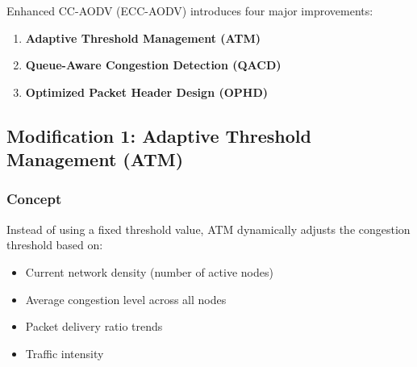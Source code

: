 \documentclass[12pt,a4paper]{article}
\begin{document}
Enhanced CC-AODV (ECC-AODV) introduces four major improvements:

\begin{enumerate}
    \item \textbf{Adaptive Threshold Management (ATM)}
    \item \textbf{Queue-Aware Congestion Detection (QACD)}
    \item \textbf{Optimized Packet Header Design (OPHD)}
\end{enumerate}

\subsection{Modification 1: Adaptive Threshold Management (ATM)}

\subsubsection{Concept}
Instead of using a fixed threshold value, ATM dynamically adjusts the congestion threshold based on:
\begin{itemize}
    \item Current network density (number of active nodes)
    \item Average congestion level across all nodes
    \item Packet delivery ratio trends
    \item Traffic intensity
\end{itemize}


\end{document}
